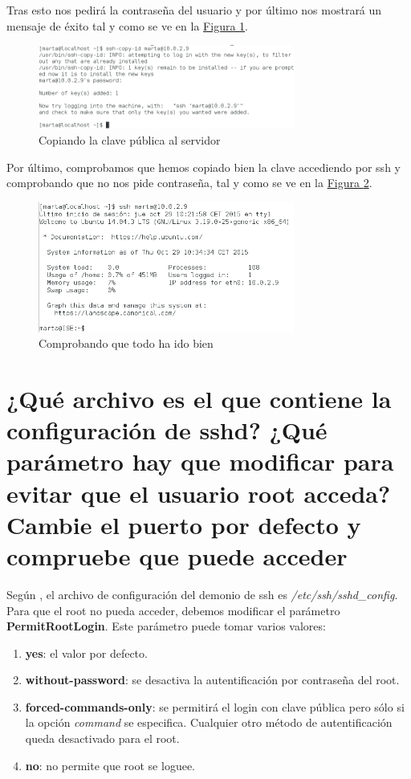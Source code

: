 \documentclass[10pt,a4paper,spanish]{article}
\numberwithin{equation}{section} %
\numberwithin{figure}{section} %
\numberwithin{table}{section} %
\begin{document}
Tras esto nos pedirá la contraseña del usuario y por último nos mostrará un mensaje de éxito tal y como se ve en la \hyperref[copyid]{Figura \ref*{copyid}}.

\begin{figure}[!h]
    \centering
    \includegraphics[width=0.75\textwidth]{8}
    \caption{Copiando la clave pública al servidor}
    \label{copyid}
\end{figure}

Por último, comprobamos que hemos copiado bien la clave accediendo por ssh y comprobando que no nos pide contraseña, tal y como se ve en la \hyperref[fin]{Figura \ref*{fin}}.

\begin{figure}[!h]
    \centering
    \includegraphics[width=0.75\textwidth]{9}
    \caption{Comprobando que todo ha ido bien}
    \label{fin}
\end{figure}

\section{¿Qué archivo es el que contiene la configuración de sshd? ¿Qué parámetro hay que modificar para evitar que el usuario root acceda? Cambie el puerto por defecto y compruebe que puede acceder}
Según \cite{mansshd}, el archivo de configuración del demonio de ssh es \textit{/etc/ssh/sshd\_config}. Para que el root no pueda acceder, debemos modificar el parámetro \textbf{PermitRootLogin}. Este parámetro puede tomar varios valores:
\begin{enumerate}[$\heartsuit$]
    \item \textbf{yes}: el valor por defecto.
    \item \textbf{without-password}: se desactiva la autentificación por contraseña del root.
    \item \textbf{forced-commands-only}: se permitirá el login con clave pública pero sólo si la opción \textit{command} se especifica. Cualquier otro método de autentificación queda desactivado para el root.
    \item \textbf{no}: no permite que root se loguee.
\end{enumerate}
\end{document}
